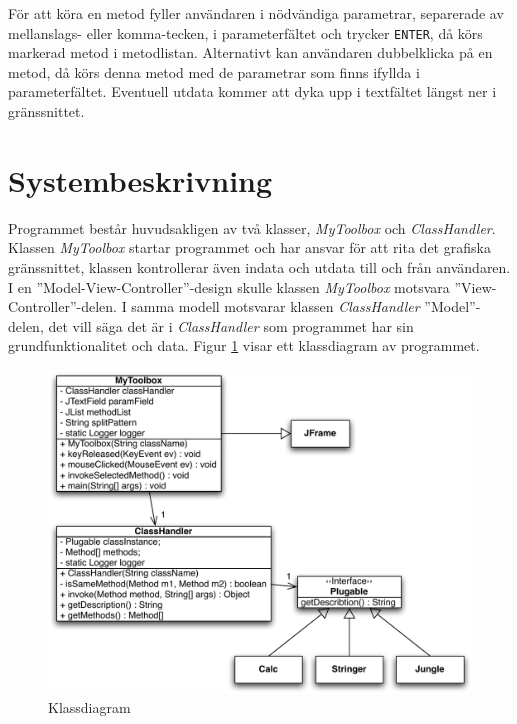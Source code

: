 \documentclass[a4paper, 12pt]{article}
\begin{document}
För att köra en metod fyller användaren i nödvändiga parametrar,
separerade av mellanslags- eller komma-tecken, i parameterfältet och
trycker \verb!ENTER!, då körs markerad metod i
metodlistan. Alternativt kan användaren dubbelklicka på en metod, då
körs denna metod med de parametrar som finns ifyllda i
parameterfältet. Eventuell utdata kommer att dyka upp i textfältet
längst ner i gränssnittet.

\section{Systembeskrivning}
Programmet består huvudsakligen av två klasser, \textit{MyToolbox} och
\textit{ClassHandler}. Klassen \textit{MyToolbox} startar programmet
och har ansvar för att rita det grafiska gräns\-snittet, klassen
kontrollerar även indata och utdata till och från använd\-aren. I en
''Model-View-Controller''-design skulle klassen \textit{MyToolbox}
motsvara ''View-Controller''-delen. I samma modell motsvarar klassen
\textit{ClassHandler} ''Model''-delen, det vill säga det är i
\textit{ClassHandler} som programmet har sin grundfunktionalitet och
data. Figur \ref{fig:class} visar ett klassdiagram av programmet.

\begin{figure}[H]
  \begin{center}
    \includegraphics[width=130mm]{images/class.pdf}
    \caption{Klassdiagram}
    \label{fig:class}
  \end{center}
\end{figure}
\end{document}
